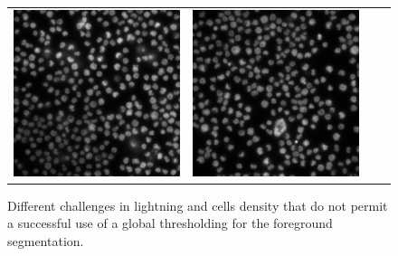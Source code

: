 \begin{figure}[H]
\begin{tabularx}{\textwidth}{YYYY}
            \includegraphics{bilder/lightning-conditions/lightning-3.png} &
            \includegraphics{bilder/lightning-conditions/lightning-4.png}
        \end{tabularx}
    \caption[Different lighting conditions]%
    {Different challenges in lightning and cells density that do not permit a successful use of a global thresholding for the foreground segmentation.}
    \label{fig:lightning_conditions}
\end{figure}

